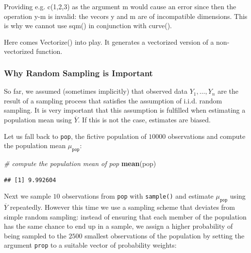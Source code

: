 \documentclass[]{book}
\newenvironment{Shaded}{\begin{snugshade}}{\end{snugshade}}
\newcommand{\KeywordTok}[1]{\textcolor[rgb]{0.13,0.29,0.53}{\textbf{#1}}}
\newcommand{\CommentTok}[1]{\textcolor[rgb]{0.56,0.35,0.01}{\textit{#1}}}
\newcommand{\NormalTok}[1]{#1}
\theoremstyle{definition}
\theoremstyle{definition}
\theoremstyle{definition}
\theoremstyle{remark}
\begin{document}
Providing e.g. c(1,2,3) as the argument m would cause an error since
then the operation y-m is invalid: the vecors y and m are of
incompatible dimensions. This is why we cannot use sqm() in conjunction
with curve().

Here comes Vectorize() into play. It generates a vectorized version of a
non-vectorized function.

\subsubsection*{Why Random Sampling is
Important}\label{why-random-sampling-is-important}

So far, we assumed (sometimes implicitly) that observed data
\(Y_1, \dots, Y_n\) are the result of a sampling process that satisfies
the assumption of i.i.d. random sampling. It is very important that this
assumption is fulfilled when estimating a population mean using
\(\overline{Y}\). If this is not the case, estimates are biased.

Let us fall back to \texttt{pop}, the fictive population of \(10000\)
observations and compute the population mean \(\mu_{\texttt{pop}}\):

\begin{Shaded}
\begin{Highlighting}[]
\CommentTok{# compute the population mean of pop}
\KeywordTok{mean}\NormalTok{(pop)}
\end{Highlighting}
\end{Shaded}

\begin{verbatim}
## [1] 9.992604
\end{verbatim}

Next we sample \(10\) observations from \texttt{pop} with
\texttt{sample()} and estimate \(\mu_{\texttt{pop}}\) using
\(\overline{Y}\) repeatedly. However this time we use a sampling scheme
that deviates from simple random sampling: instead of ensuring that each
member of the population has the same chance to end up in a sample, we
assign a higher probability of being sampled to the \(2500\) smallest
observations of the population by setting the argument \texttt{prop} to
a suitable vector of probability weights:
\end{document}
